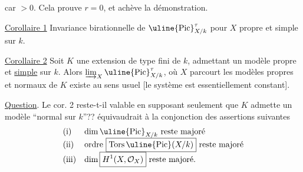 car $>0$. Cela prouve $r=0$, et achève la démonstration.

\uline{Corollaire 1} Invariance birationnelle de $\uline{\mathrm{Pic}}^\tau_{X/k}$
pour $X$ propre et simple sur $k$.

\uline{Corollaire 2} Soit $K$ une extension
de type fini de $k$, admettant un modèle 
propre et \uline{simple} sur $k$. Alors
$\varinjlim_X\uline{\mathrm{Pic}}^\tau_{X/k}$, où $X$ parcourt
les modèles propres et normaux  de $K$
existe au sens usuel [le système 
est essentiellement constant].


\uline{Question}. Le cor. 2 reste-t-il valable
en supposant seulement que $K$ admette
un modèle ``normal sur $k$''??
 équivaudrait à la conjonction des
assertions suivantes
\[
\begin{array}{ll}
\text{(i)}&\dim\uline{\mathrm{Pic}}_{X/k}\text{ reste majoré}\\
\text{(ii)}&\text{ordre }\boxed{\mathrm{Tors}\,\uline{\mathrm{Pic}}(X/k)}
                    \text{ reste majoré}\\
\text{(iii)}&\dim\boxed{H^1(X,\mathcal O_X)}\text{ reste majoré.}
\end{array}
\]

